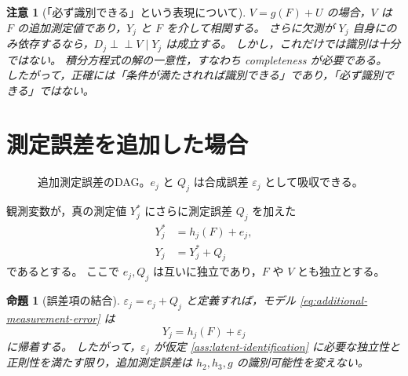\documentclass[dvipdfmx,autodetect-engine]{jsarticle}
\newtheorem{proposition}{命題}
\newtheorem{remark}{注意}
\newcommand{\indep}{\mathrel{\perp\!\!\!\perp}}
\newcommand{\1}{\mathbf{1}}
\begin{document}
\begin{remark}[「必ず識別できる」という表現について]
$V=g(F)+U$ の場合，$V$ は $F$ の追加測定値であり，$Y_j$ と $F$ を介して相関する。
さらに欠測が $Y_j$ 自身にのみ依存するなら，$D_j\indep V\mid Y_j$ は成立する。
しかし，これだけでは識別は十分ではない。
積分方程式の解の一意性，すなわち completeness が必要である。
したがって，正確には「条件が満たされれば識別できる」であり，「必ず識別できる」ではない。
\end{remark}

\section{測定誤差を追加した場合}

\begin{figure}[tbp]
\centering
{}
\caption{追加測定誤差のDAG。$e_j$ と $Q_j$ は合成誤差 $\varepsilon_j$ として吸収できる。}
\label{fig:dag-additional-measurement-error}
\end{figure}


観測変数が，真の測定値 $Y_j^*$ にさらに測定誤差 $Q_j$ を加えた
\begin{align}
  Y_j^* &= h_j(F)+e_j, \\
  Y_j &= Y_j^*+Q_j
  \label{eq:additional-measurement-error}
\end{align}
であるとする。
ここで $e_j,Q_j$ は互いに独立であり，$F$ や $V$ とも独立とする。

\begin{proposition}[誤差項の結合]
\label{prop:error-combination}
$\varepsilon_j=e_j+Q_j$ と定義すれば，モデル \eqref{eq:additional-measurement-error} は
\begin{equation}
  Y_j=h_j(F)+\varepsilon_j
  \label{eq:combined-error-model}
\end{equation}
に帰着する。
したがって，$\varepsilon_j$ が仮定 \ref{ass:latent-identification} に必要な独立性と正則性を満たす限り，追加測定誤差は $h_2,h_3,g$ の識別可能性を変えない。
\end{proposition}
\end{document}
